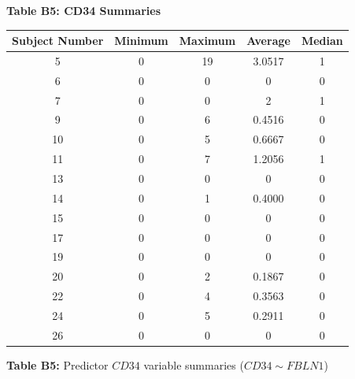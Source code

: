 \documentclass[12pt,]{article}
\begin{document}
\begin{center}
\begin{scriptsize}
\textbf{\large{Table B5: CD34 Summaries}}


\begin{tabular}{|c|c|c|c|c|}
\hline 
Subject Number & Minimum & Maximum & Average & Median \\ 
\hline
\hline
5  & 0 & 19 & 3.0517 & 1 \\ 
\hline 
6  & 0 & 0 & 0 & 0 \\ 
\hline 
7  & 0 & 0 & 2 & 1 \\ 
\hline 
9  & 0 & 6 & 0.4516 & 0 \\ 
\hline 
10 & 0 & 5 & 0.6667 & 0 \\ 
\hline 
11 & 0 & 7 & 1.2056 & 1 \\ 
\hline 
13 & 0 & 0 & 0 & 0 \\ 
\hline 
14 & 0 & 1 & 0.4000 & 0 \\ 
\hline 
15 & 0 & 0 & 0 & 0 \\ 
\hline 
17 & 0 & 0 & 0 & 0 \\ 
\hline 
19 & 0 & 0 & 0 & 0 \\ 
\hline 
20 & 0 & 2 & 0.1867 & 0 \\ 
\hline 
22 & 0 & 4 & 0.3563 & 0 \\ 
\hline 
24 & 0 & 5 & 0.2911 & 0 \\ 
\hline 
26 & 0 & 0 & 0 & 0 \\  
\hline
\end{tabular}

\vspace{5pt}

\textbf{Table B5:} Predictor $CD34$ variable summaries ($CD34 \sim FBLN1$)

\end{scriptsize}
\end{center}
\end{document}

